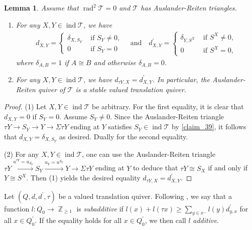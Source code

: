 \documentclass[12pt]{amsart}
\numberwithin{equation}{subsection}
\theoremstyle{plain}
\newtheorem{lemma}[theorem]{Lemma}
\theoremstyle{definition}
\newcommand{\rad}{\operatorname{rad}}
\newcommand{\ind}{\operatorname{ind}}
\newcommand{\Z}{\operatorname{\mathbb{Z}}\nolimits}
\newcommand{\T}{\mathcal{T}}
\begin{document}
\begin{lemma}\label{claim_31}
Assume that $\rad^2\T=0$ and $\T$ has Auslander-Reiten triangles.  
\begin{enumerate}
\item   For any $X, Y\in\ind\T$, we have 
\begin{align}
d_{X, Y} = 
\begin{cases}
    \delta_{X, S_Y} & \text{ if $S_Y\neq 0$},\\
    0 & \text{ if $S_Y =0$}
\end{cases}
    \quad\text{and}\quad
d_{X, Y}^\prime = 
\begin{cases}
    \delta_{Y, S^X} & \text{ if $S^X\neq 0$},\\
    0 & \text{ if $S^X =0$},
\end{cases}
\end{align}
where $ \delta_{A, B} = 1$ if $A \cong B$ and otherwise $\delta_{A, B} = 0$. 
\item 
For any $X, Y\in\ind\T$, we have $d_{\tau Y, X} = d_{X, Y}^\prime$.
In particular, the Auslander-Reiten quiver of $\T$ is a stable valued translation quiver.
\end{enumerate}
\end{lemma}
\begin{proof} 
(1) Let $X, Y\in\ind\T$ be arbitrary.
For the first equality, it is clear that $d_{X, Y}=0$ if $S_Y=0$.
Assume $S_Y\neq 0$.
Since the Auslander-Reiten triangle $\tau Y \to S_Y \to Y \to \Sigma \tau Y$ ending at $Y$ satisfies $S_Y\in\ind\T$ by \cref{claim_39}, it follows that $d_{X, Y} = \delta_{X, S_Y}$ as desired.
Dually for the second equality.





(2) For any $X, Y\in\ind\T$, one can use the Auslander-Reiten triangle $\tau Y \xrightarrow{u^{\tau Y}=u_{S_Y}} S_Y \xrightarrow{u_Y=u^{S_Y}} Y \to \Sigma \tau Y$ ending at $Y$ to deduce that $\tau Y \cong S_X$ if and only if $Y \cong S^X$.
Then (1) yields the desired equality $d_{\tau Y, X} = d_{X, Y}^\prime$.
\end{proof}




Let $(Q, d, d^\prime, \tau)$ be a valued translation quiver.
Following \cite{Happel-Preiser-Ringel_1980}, we say that 
a function $l: Q_0 \to \Z_{\geq 1}$ is {\it subadditive} if $l(x) + l(\tau x) \geq \sum_{y\in x^-} l(y) d_{y, x}^\prime$ for all $x\in Q_0^\prime$.
If the equality holds for all $x\in Q_0^\prime$, we then call $l$ {\it additive}. 
\end{document}
